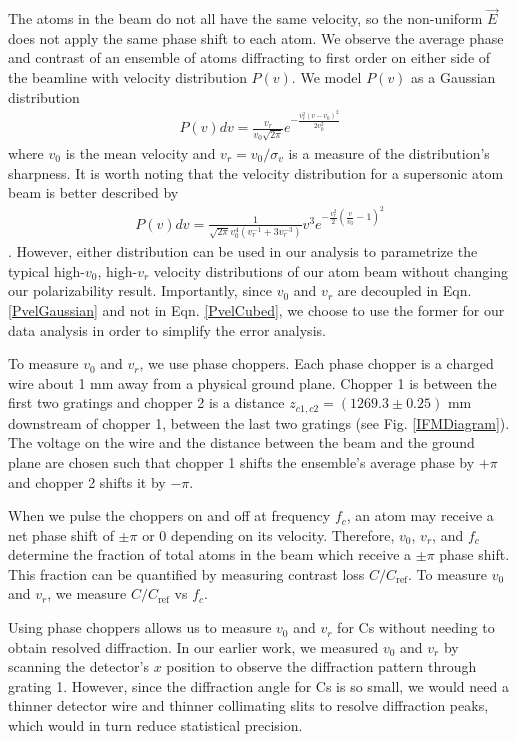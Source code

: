 \documentclass[twocolumn,prl,showpacs,superscriptaddress]{revtex4-1}   %
\newcommand{\figref}[1]{Fig. \ref{#1}}
\newcommand{\eqnref}[1]{Eqn. \eqref{#1}}
\begin{document}
The atoms in the beam do not all have the same velocity, so the non-uniform $\vec{E}$ does not apply the same phase shift to each atom.
We observe the average phase and contrast of an ensemble of atoms diffracting to first order on either side of the beamline with velocity distribution $P(v)$. 
We model $P(v)$ as a Gaussian distribution
\begin{align}
	P(v)dv = \frac{v_r}{v_0\sqrt{2\pi}}e^{-\frac{v_r^2(v-v_0)^2}{2v_0^2}}
	\label{PvelGaussian}
\end{align}
where $v_0$ is the mean velocity and $v_r = v_0/\sigma_v$ is a measure of the distribution's sharpness. It is worth noting that the velocity distribution for a supersonic atom beam is better described by
\begin{align}
	P(v)dv = \frac{1}{\sqrt{2\pi}v_0^4(v_r^{-1}+3v_r^{-3})}
	v^3
	e^{-\frac{v_r^2}{2}\left(\frac{v}{v_0}-1\right)^2}
	\label{PvelCubed}
\end{align}
\cite{Berman1997}. However, either distribution can be used in our analysis to parametrize the typical high-$v_0$, high-$v_r$ velocity distributions of our atom beam without changing our polarizability result. Importantly, since $v_0$ and $v_r$ are decoupled in \eqnref{PvelGaussian} and not in \eqnref{PvelCubed}, we choose to use the former for our data analysis in order to simplify the error analysis. 


To measure $v_0$ and $v_r$, we use phase choppers. Each phase chopper is a charged wire about 1 mm away from a physical ground plane. Chopper 1 is between the first two gratings and chopper 2 is a distance $z_{c1,c2} = (1269.3 \pm 0.25)$ mm downstream of chopper 1, between the last two gratings (see \figref{IFMDiagram}). The voltage on the wire and the distance between the beam and the ground plane are chosen such that chopper 1 shifts the ensemble's average phase by $+\pi$ and chopper 2 shifts it by $-\pi$. 

When we pulse the choppers on and off at frequency $f_c$, an atom may receive a net phase shift of $\pm\pi$ or $0$ depending on its velocity. Therefore, $v_0$, $v_r$, and $f_c$ determine the fraction of total atoms in the beam which receive a $\pm\pi$ phase shift. This fraction can be quantified by measuring contrast loss $C/C_{\mathrm{ref}}$. To measure $v_0$ and $v_r$, we measure $C/C_{\mathrm{ref}}$ vs $f_c$.

Using phase choppers allows us to measure $v_0$ and $v_r$ for Cs without needing to obtain resolved diffraction. In our earlier work, we measured $v_0$ and $v_r$ by scanning the detector's $x$ position to observe the diffraction pattern through grating 1. However, since the diffraction angle for Cs is so small, we would need a thinner detector wire and thinner collimating slits to resolve diffraction peaks, which would in turn reduce statistical precision.
\end{document}
